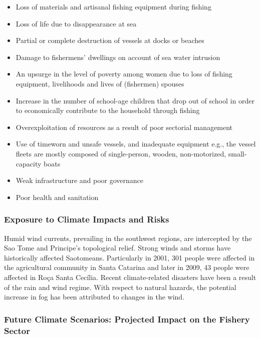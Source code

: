 \documentclass[
]{book}
\providecommand{\tightlist}{%
  \setlength{\itemsep}{0pt}\setlength{\parskip}{0pt}}
\begin{document}
\begin{itemize}
\tightlist
\item
  Loss of materials and artisanal fishing equipment during fishing
\item
  Loss of life due to disappearance at sea
\item
  Partial or complete destruction of vessels at docks or beaches
\item
  Damage to fishermens' dwellings on account of sea water intrusion
\item
  An upsurge in the level of poverty among women due to loss of fishing equipment, livelihoods and lives of (fishermen) spouses
\item
  Increase in the number of school-age children that drop out of school in order to economically contribute to the household through fishing
\item
  Overexploitation of resources as a result of poor sectorial management
\item
  Use of timeworn and unsafe vessels, and inadequate equipment e.g., the vessel fleets are mostly composed of single-person, wooden, non-motorized, small-capacity boats
\item
  Weak infrastructure and poor governance
\item
  Poor health and sanitation
\end{itemize}

\hypertarget{exposure-to-climate-impacts-and-risks-1}{%
\subsubsection{Exposure to Climate Impacts and Risks}\label{exposure-to-climate-impacts-and-risks-1}}

Humid wind currents, prevailing in the southwest regions, are intercepted by the Sao Tome and Principe's topological relief. Strong winds and storms have historically affected Saotomeans. Particularly in 2001, 301 people were affected in the agricultural community in Santa Catarina and later in 2009, 43 people were affected in Roça Santa Cecília. Recent climate-related disasters have been a result of the rain and wind regime. With respect to natural hazards, the potential increase in fog has been attributed to changes in the wind.

\hypertarget{future-climate-scenarios-projected-impact-on-the-fishery-sector}{%
\subsubsection{Future Climate Scenarios: Projected Impact on the Fishery Sector}\label{future-climate-scenarios-projected-impact-on-the-fishery-sector}}
\end{document}
